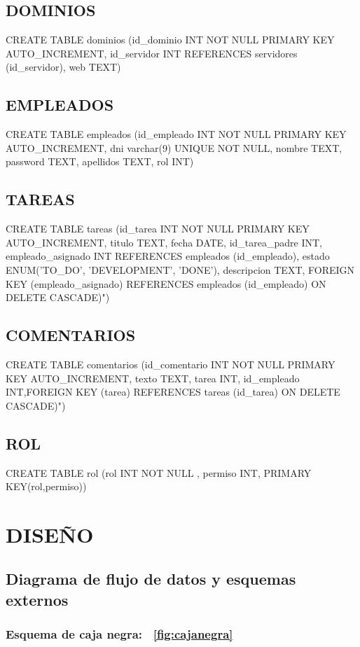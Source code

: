 \documentclass[paper=a4, fontsize=11pt, spanish]{scrartcl}
\begin{document}
\subsection{DOMINIOS}
CREATE TABLE dominios (id\_dominio INT NOT NULL PRIMARY KEY AUTO\_INCREMENT, id\_servidor INT REFERENCES servidores (id\_servidor), web TEXT)

\subsection{EMPLEADOS}
CREATE TABLE empleados (id\_empleado INT NOT NULL PRIMARY KEY AUTO\_INCREMENT, dni varchar(9) UNIQUE NOT NULL,  nombre TEXT, password TEXT, apellidos TEXT, rol INT)

\subsection{TAREAS}
CREATE TABLE tareas (id\_tarea INT NOT NULL PRIMARY KEY AUTO\_INCREMENT, titulo TEXT, fecha DATE, id\_tarea\_padre INT, empleado\_asignado INT REFERENCES empleados (id\_empleado), estado ENUM('TO\_DO', 'DEVELOPMENT', 'DONE'), descripcion TEXT, FOREIGN KEY (empleado\_asignado) REFERENCES empleados (id\_empleado) ON DELETE CASCADE)")

\subsection{COMENTARIOS}
CREATE TABLE comentarios (id\_comentario INT NOT NULL PRIMARY KEY AUTO\_INCREMENT, texto TEXT, tarea INT, id\_empleado INT,FOREIGN KEY (tarea) REFERENCES tareas (id\_tarea) ON DELETE CASCADE)")

\subsection{ROL}
CREATE TABLE rol (rol INT NOT NULL , permiso INT, PRIMARY KEY(rol,permiso))


\section{DISEÑO}
\subsection {Diagrama de flujo de datos y esquemas externos}
\subsubsection* {Esquema de caja negra: ~\ref{fig:cajanegra}}
\end{document}
